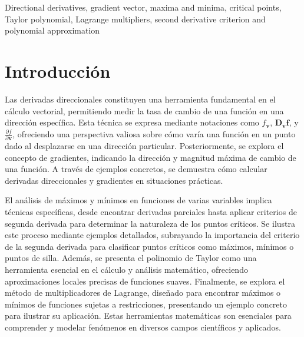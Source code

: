 \renewcommand{\IEEEkeywordsname}{Palabras Clave}
\begin{IEEEkeywords}
Directional derivatives, gradient vector, maxima and minima, critical points, Taylor polynomial, Lagrange multipliers, second derivative criterion and polynomial approximation
\end{IEEEkeywords}

\section{Introducción}\label{intro}

    Las derivadas direccionales constituyen una herramienta fundamental en el cálculo vectorial, permitiendo medir la tasa de cambio de una función en una dirección específica. Esta técnica se expresa mediante notaciones como \(f_{\mathbf{v}}\), \(\mathbf{D_vf}\), y \(\frac{\partial f}{\partial \mathbf{v}}\), ofreciendo una perspectiva valiosa sobre cómo varía una función en un punto dado al desplazarse en una dirección particular. Posteriormente, se explora el concepto de gradientes, indicando la dirección y magnitud máxima de cambio de una función. A través de ejemplos concretos, se demuestra cómo calcular derivadas direccionales y gradientes en situaciones prácticas.

    El análisis de máximos y mínimos en funciones de varias variables implica técnicas específicas, desde encontrar derivadas parciales hasta aplicar criterios de segunda derivada para determinar la naturaleza de los puntos críticos. Se ilustra este proceso mediante ejemplos detallados, subrayando la importancia del criterio de la segunda derivada para clasificar puntos críticos como máximos, mínimos o puntos de silla. Además, se presenta el polinomio de Taylor como una herramienta esencial en el cálculo y análisis matemático, ofreciendo aproximaciones locales precisas de funciones suaves. Finalmente, se explora el método de multiplicadores de Lagrange, diseñado para encontrar máximos o mínimos de funciones sujetas a restricciones, presentando un ejemplo concreto para ilustrar su aplicación. Estas herramientas matemáticas son esenciales para comprender y modelar fenómenos en diversos campos científicos y aplicados.


